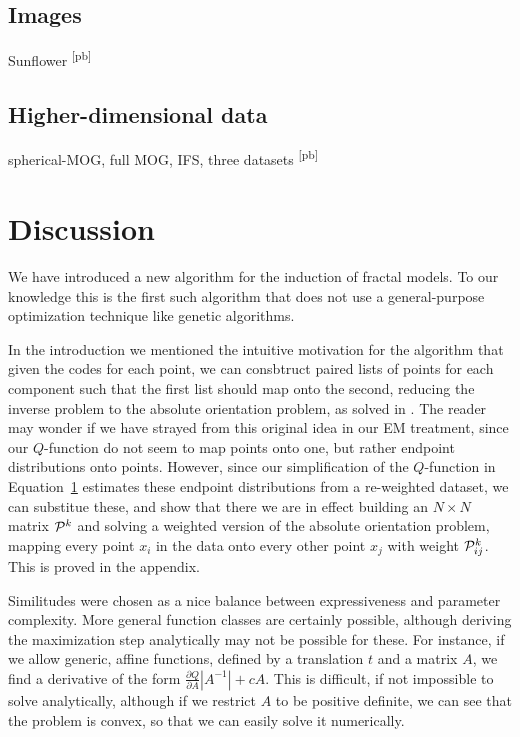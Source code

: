 \documentclass[10pt,a4paper,oneside]{article}
\theoremstyle{definition}
\theoremstyle{definition}
\newcommand{\pb}[1]{\textcolor{OliveGreen}{\small #1 \textsuperscript{[pb]} }}
\begin{document}
\subsection{Images}

\pb{Sunflower}

\subsection{Higher-dimensional data}

\pb{spherical-MOG, full MOG, IFS, three datasets}

\section{Discussion}

We have introduced a new algorithm for the induction of fractal models. To our knowledge this is the first such algorithm that does not use a general-purpose optimization technique like genetic algorithms. 

In the introduction we mentioned the intuitive motivation for the algorithm that given the codes for each point, we can consbtruct paired lists of points for each component such that the first list should map onto the second, reducing the inverse problem to the absolute orientation problem, as solved in \cite{umeyama1991least}. The reader may wonder if we have strayed from this original idea in our EM treatment, since our $Q$-function do not seem to map points onto one, but rather endpoint distributions onto points. However, since our simplification of the $Q$-function in Equation~\ref{} estimates these endpoint distributions from a re-weighted dataset, we can substitue these, and show that there we are in effect building an $N \times N$ matrix ${\cal P}^k$ and solving a weighted version of the absolute orientation problem, mapping every point $x_i$ in the data onto every other point $x_j$ with weight ${\cal P}^k_{ij}$. This is proved in the appendix. 

Similitudes were chosen as a nice balance between expressiveness and parameter complexity. More general function classes are certainly possible, although deriving the maximization step analytically may not be possible for these. For instance, if we allow generic, affine  functions, defined by a translation $t$ and a matrix $A$, we find a derivative of the form $\frac{\partial Q}{\partial A} |A^{-1}| + cA$. This is difficult, if not impossible to solve analytically, although if we restrict $A$ to be positive definite, we can see that the problem is convex, so that we can easily solve it numerically.
\end{document}

